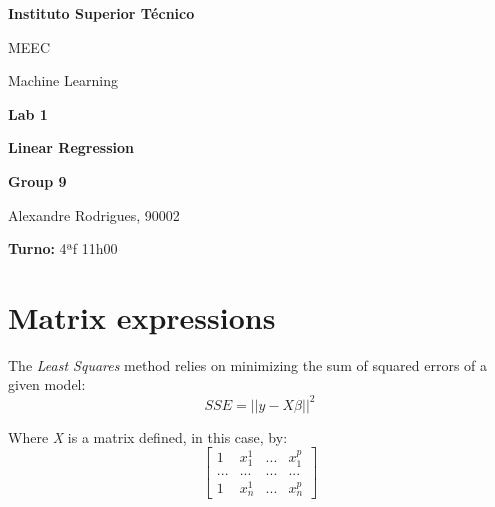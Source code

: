 \documentclass[a4paper,2pt]{report}
\begin{document}
\begin{titlepage}
    \begin{center}
        \vspace*{3cm}
 
        \LARGE
        \textbf{Instituto Superior Técnico}
        \vskip 0.4cm
 
        \Large{MEEC}
        \vskip 0.2cm

        \Large{Machine Learning}
        \vskip 3cm
        

 
        \Huge{\textbf{Lab 1}}
        \vskip 0.5cm

        \huge{\textbf{Linear Regression}}
        \vskip 0.5cm

 
        \vfill
 
        \large
        \textbf{Group 9}\\
        \vspace{0.3cm}
        
        Alexandre Rodrigues, 90002\\
        
        \vspace{1cm}

        \textbf{Turno:} 4ªf 11h00

    \end{center}
\end{titlepage}

\tableofcontents
\newpage

\setcounter{chapter}{1}
\section{Matrix expressions}

    \par The \textit{Least Squares} method relies on minimizing the sum of squared errors of a given model:
    \begin{equation}
        \textit{SSE} = ||y - X\beta||^2
    \end{equation}

    \par Where \textit{X} is a matrix defined, in this case, by:
    \begin{equation}
        \begin{bmatrix}
            1 & x_1^1 & \textit{...} & x_1^p\\
            \textit{...} & \textit{...} & \textit{...} & \textit{...}\\
            1 & x_n^1 & \textit{...} & x_n^p
        \end{bmatrix}
    \end{equation}
\end{document}
